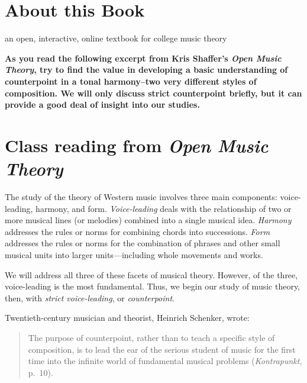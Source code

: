 \documentclass{book}
\begin{document}
\addtocounter{page}{2}

\chapter*{About this Book}
an open, interactive, online textbook for college music theory

\setcounter{tocdepth}{3}
\tableofcontents

\mainmatter

\textbf{As you read the following excerpt from Kris Shaffer's \emph{Open Music
Theory}, try to find the value in developing a basic understanding of
counterpoint in a tonal harmony--two very different styles of composition. We
will only discuss strict counterpoint briefly, but it can provide a good deal
of insight into our studies.}

\hypertarget{class-reading-from-open-music-theory}{%
\chapter{\texorpdfstring{Class reading from \emph{Open Music
Theory}}{Class reading from Open Music Theory}}\label{class-reading-from-open-music-theory}}

The study of the theory of Western music involves three main components:
voice-leading, harmony, and form. \emph{Voice-leading} deals with the
relationship of two or more musical lines (or melodies) combined into a single
musical idea. \emph{Harmony} addresses the rules or norms for combining chords
into successions. \emph{Form} addresses the rules or norms for the combination
of phrases and other small musical units into larger units---including whole
movements and works.

We will address all three of these facets of musical theory. However, of the
three, voice-leading is the most fundamental. Thus, we begin our study of
music theory, then, with \emph{strict voice-leading}, or \emph{counterpoint}.

Twentieth-century musician and theorist, Heinrich Schenker, wrote:

\begin{quote}
The purpose of counterpoint, rather than to teach a specific style of
composition, is to lead the ear of the serious student of music for the first
time into the infinite world of fundamental musical problems
(\emph{Kontrapunkt}, p.~10).
\end{quote}
\end{document}

